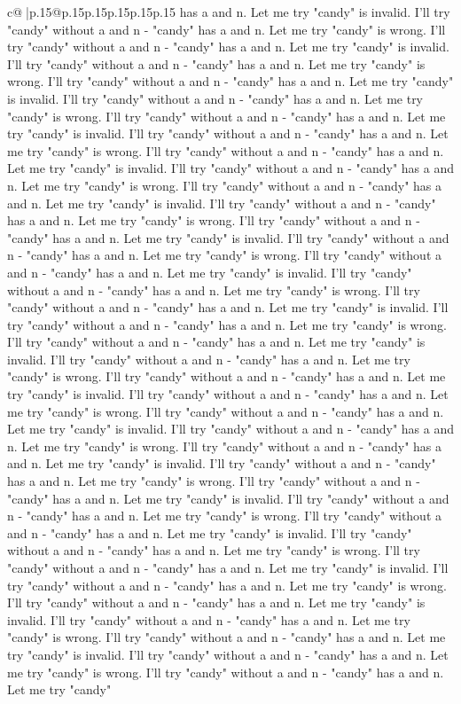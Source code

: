 \documentclass{article}
\begin{document}
{\begin{supertabular}{c@{$\;$}|p{.15\linewidth}@{}p{.15\linewidth}p{.15\linewidth}p{.15\linewidth}p{.15\linewidth}p{.15\linewidth}}
{{{has a and n. Let me try "candy" is invalid. I'll try "candy" without a and n {-} "candy" has a and n. Let me try "candy" is wrong. I'll try "candy" without a and n {-} "candy" has a and n. Let me try "candy" is invalid. I'll try "candy" without a and n {-} "candy" has a and n. Let me try "candy" is wrong. I'll try "candy" without a and n {-} "candy" has a and n. Let me try "candy" is invalid. I'll try "candy" without a and n {-} "candy" has a and n. Let me try "candy" is wrong. I'll try "candy" without a and n {-} "candy" has a and n. Let me try "candy" is invalid. I'll try "candy" without a and n {-} "candy" has a and n. Let me try "candy" is wrong. I'll try "candy" without a and n {-} "candy" has a and n. Let me try "candy" is invalid. I'll try "candy" without a and n {-} "candy" has a and n. Let me try "candy" is wrong. I'll try "candy" without a and n {-} "candy" has a and n. Let me try "candy" is invalid. I'll try "candy" without a and n {-} "candy" has a and n. Let me try "candy" is wrong. I'll try "candy" without a and n {-} "candy" has a and n. Let me try "candy" is invalid. I'll try "candy" without a and n {-} "candy" has a and n. Let me try "candy" is wrong. I'll try "candy" without a and n {-} "candy" has a and n. Let me try "candy" is invalid. I'll try "candy" without a and n {-} "candy" has a and n. Let me try "candy" is wrong. I'll try "candy" without a and n {-} "candy" has a and n. Let me try "candy" is invalid. I'll try "candy" without a and n {-} "candy" has a and n. Let me try "candy" is wrong. I'll try "candy" without a and n {-} "candy" has a and n. Let me try "candy" is invalid. I'll try "candy" without a and n {-} "candy" has a and n. Let me try "candy" is wrong. I'll try "candy" without a and n {-} "candy" has a and n. Let me try "candy" is invalid. I'll try "candy" without a and n {-} "candy" has a and n. Let me try "candy" is wrong. I'll try "candy" without a and n {-} "candy" has a and n. Let me try "candy" is invalid. I'll try "candy" without a and n {-} "candy" has a and n. Let me try "candy" is wrong. I'll try "candy" without a and n {-} "candy" has a and n. Let me try "candy" is invalid. I'll try "candy" without a and n {-} "candy" has a and n. Let me try "candy" is wrong. I'll try "candy" without a and n {-} "candy" has a and n. Let me try "candy" is invalid. I'll try "candy" without a and n {-} "candy" has a and n. Let me try "candy" is wrong. I'll try "candy" without a and n {-} "candy" has a and n. Let me try "candy" is invalid. I'll try "candy" without a and n {-} "candy" has a and n. Let me try "candy" is wrong. I'll try "candy" without a and n {-} "candy" has a and n. Let me try "candy" is invalid. I'll try "candy" without a and n {-} "candy" has a and n. Let me try "candy" is wrong. I'll try "candy" without a and n {-} "candy" has a and n. Let me try "candy" is invalid. I'll try "candy" without a and n {-} "candy" has a and n. Let me try "candy" is wrong. I'll try "candy" without a and n {-} "candy" has a and n. Let me try "candy" is invalid. I'll try "candy" without a and n {-} "candy" has a and n. Let me try "candy" is wrong. I'll try "candy" without a and n {-} "candy" has a and n. Let me try "candy" }}}
\end{supertabular}}
\end{document}
